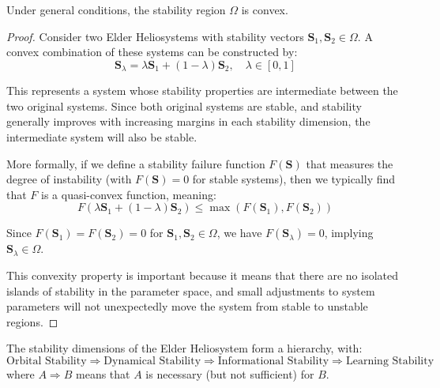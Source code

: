 \begin{theorem}
Under general conditions, the stability region $\Omega$ is convex.
\end{theorem}

\begin{proof}
Consider two Elder Heliosystems with stability vectors $\mathbf{S}_1, \mathbf{S}_2 \in \Omega$. A convex combination of these systems can be constructed by:
\begin{equation}
\mathbf{S}_{\lambda} = \lambda \mathbf{S}_1 + (1-\lambda) \mathbf{S}_2, \quad \lambda \in [0,1]
\end{equation}

This represents a system whose stability properties are intermediate between the two original systems. Since both original systems are stable, and stability generally improves with increasing margins in each stability dimension, the intermediate system will also be stable.

More formally, if we define a stability failure function $F(\mathbf{S})$ that measures the degree of instability (with $F(\mathbf{S}) = 0$ for stable systems), then we typically find that $F$ is a quasi-convex function, meaning:
\begin{equation}
F(\lambda \mathbf{S}_1 + (1-\lambda) \mathbf{S}_2) \leq \max(F(\mathbf{S}_1), F(\mathbf{S}_2))
\end{equation}

Since $F(\mathbf{S}_1) = F(\mathbf{S}_2) = 0$ for $\mathbf{S}_1, \mathbf{S}_2 \in \Omega$, we have $F(\mathbf{S}_{\lambda}) = 0$, implying $\mathbf{S}_{\lambda} \in \Omega$.

This convexity property is important because it means that there are no isolated islands of stability in the parameter space, and small adjustments to system parameters will not unexpectedly move the system from stable to unstable regions.
\end{proof}

\begin{theorem}
The stability dimensions of the Elder Heliosystem form a hierarchy, with:
\begin{equation}
\text{Orbital Stability} \Rightarrow \text{Dynamical Stability} \Rightarrow \text{Informational Stability} \Rightarrow \text{Learning Stability}
\end{equation}
where $A \Rightarrow B$ means that $A$ is necessary (but not sufficient) for $B$.
\end{theorem}


